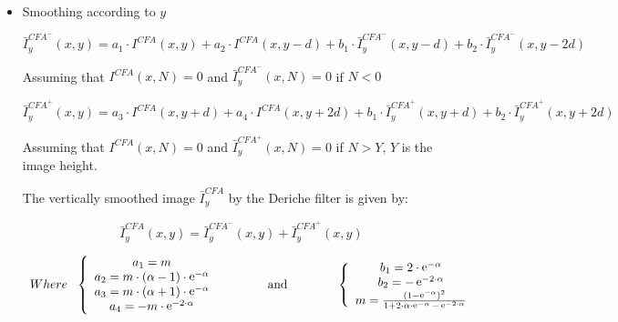 \documentclass[twoside]{article}
\newcommand\Smo{\bar} %
\DeclareMathOperator{\e}{e}
\begin{document}
\begin{itemize}
	
	\item Smoothing according to $y$
	
		
	\begin{equation}
	\label{top-bottom}
	\Smo {I}^{{CFA}^-}_y(x,y)=a_1 \cdot I^{CFA}(x,y) + a_2 \cdot I^{CFA}(x,y-d) + b_1 \cdot \Smo {I}^{{CFA}^-}_y(x,y-d) + b_2 \cdot \Smo {I}^{{CFA}^-}_y(x,y-2d)
	\end{equation}
	
	Assuming that $I^{CFA}(x,N)=0$ and $\Smo {I}^{{CFA}^-}_y(x,N)=0$ if $N<0$ 
	
	
	\begin{equation}
	\label{bottom-top}
	\Smo {I}^{{CFA}^+}_y(x,y)=a_3 \cdot I^{CFA}(x,y+d) + a_4 \cdot I^{CFA}(x,y+2d) + b_1 \cdot \Smo {I}^{{CFA}^+}_y(x,y+d) + b_2 \cdot \Smo {I}^{{CFA}^+}_y(x,y+2d)
	\end{equation}
	
	
	Assuming that  $I^{CFA}(x,N)=0$ and $\Smo {I}^{{CFA}^+}_y(x,N)=0$ if $N>Y$, $Y$ is the image height. 
	
 
	
	
	The vertically smoothed image $\Smo {I}^{CFA}_y$  by the Deriche filter is given by:	
	
	
	\begin{equation}
	\Smo {I}^{CFA}_y(x,y)=\Smo {I}^{{CFA}^-}_y(x,y) + \Smo {I}^{{CFA}^+}_y(x,y)
	\end{equation}
	
	
	
	
	\begin{equation}
	\begin{array}{lcl}
	Where~~\left\lbrace
	\begin{array}{cl}
	a_1 = m\\ 
	a_2 = m \cdot (\alpha -1)\cdot \e ^{-\alpha} \\
	a_3 = m \cdot (\alpha +1)\cdot \e ^{-\alpha}\\
	a_4 =-m \cdot \e ^{-2 \cdot \alpha}\\
	\end{array}\right.
	& \text{\hspace{1cm} and \hspace{1cm}} &
	\left\lbrace
	\begin{array}{cl}
	b_1 = 2\cdot \e ^{-\alpha}\\ 
	b_2 = -\e ^{-2 \cdot \alpha} \\
	m=\frac{(1-\e^{-\alpha})^2}{1+2 \cdot \alpha \cdot \e^{-\alpha}- \e ^{-2\cdot \alpha}}\\
	\end{array}\right.
	\end{array}
	\label{eq:parametre Deriche}
	\end{equation}
	
	
	
	
	
	
\end{itemize}
\end{document}
